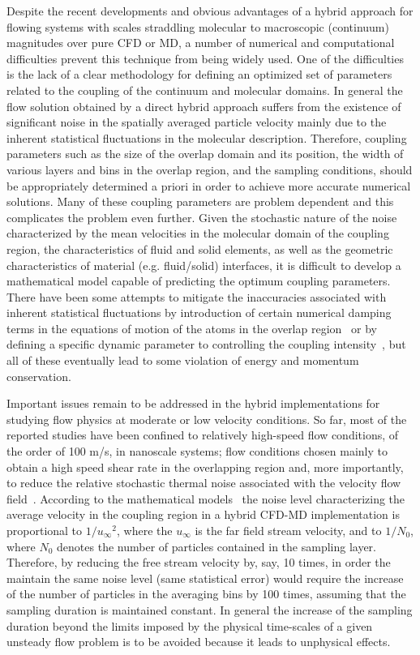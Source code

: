 \documentclass[preprint,12pt]{elsarticle}
\begin{document}
Despite the recent developments and obvious advantages of a hybrid approach for flowing systems with scales straddling molecular to macroscopic (continuum) magnitudes over pure CFD or MD, a number of numerical and computational difficulties prevent this technique from being widely used.
One of the difficulties is the lack of a clear methodology for defining an optimized set of parameters related to the coupling of the continuum and molecular domains. 
In general the flow solution obtained by a direct hybrid approach suffers from the existence of significant noise in the spatially averaged particle velocity mainly due to the inherent statistical fluctuations in the molecular description. Therefore, coupling parameters such as the size of the overlap domain and its position, the width of various layers and bins in the overlap region, and the sampling conditions, should be appropriately determined a priori in order to achieve more accurate numerical solutions.
Many of these coupling parameters are problem dependent and this complicates the problem even further. 
Given the stochastic nature of the noise characterized by the mean velocities in the molecular domain of the coupling region, the characteristics of fluid and solid elements, as well as the geometric characteristics of material (e.g. fluid/solid) interfaces, it is difficult to develop a mathematical model capable of predicting the optimum coupling parameters. 
There have been some attempts to mitigate the inaccuracies associated with inherent statistical fluctuations by introduction of certain numerical damping terms in the equations of motion of the atoms in the overlap region~\cite{Thompson,Cui} or by defining a specific dynamic parameter to controlling the coupling intensity~\cite{Wang}, but all of these eventually lead to some violation of energy and momentum conservation. 

Important issues remain to be addressed in the hybrid implementations for studying flow physics at moderate or low velocity conditions.  So far, most of the reported studies have been confined to relatively high-speed flow conditions, of the order of 100 m/s, in nanoscale systems; flow conditions chosen mainly to obtain a high speed shear rate in the overlapping region and, more importantly, to reduce the relative stochastic thermal noise associated with the velocity flow field~\cite{Yen}. According to the mathematical models~\cite{Hadjicon3,Time_Mechanism} the noise level characterizing the average velocity in the coupling region in a hybrid CFD-MD implementation is proportional to ${{1} / {{u}_{\infty}}^2}$, where the ${u_{\infty}}$ is the far field stream velocity, and to ${{1} / {N_0}}$, where ${N_0}$ denotes the number of particles contained in the sampling layer. Therefore, by reducing the free stream velocity by, say, 10 times, in order the maintain the same noise level (same statistical error)  would require the increase of the number of particles in the averaging bins by 100 times, assuming that the sampling duration is maintained constant. In general the increase of the sampling duration beyond the limits imposed by the physical time-scales of a given unsteady flow problem is to be avoided because it leads to unphysical effects.
\end{document}
